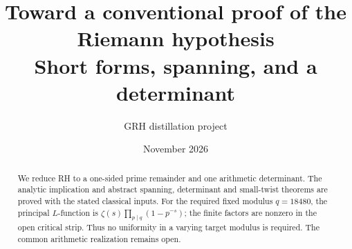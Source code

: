 
\title{Toward a conventional proof of the Riemann hypothesis\\
\large Short forms, spanning, and a determinant}
\author{GRH distillation project}
\date{November 2026}

\maketitle
\begin{abstract}
We reduce RH to a one-sided prime remainder and one arithmetic
determinant. The analytic implication and abstract spanning,
determinant and small-twist theorems are proved with the stated
classical inputs. For the required fixed modulus \(q=18480\), the
principal \(L\)-function is \(\zeta(s)\prod_{p\mid q}(1-p^{-s})\);
the finite factors are nonzero in the open critical strip. Thus no
uniformity in a varying target modulus is required. The common
arithmetic realization remains open.
\end{abstract}
\tableofcontents


